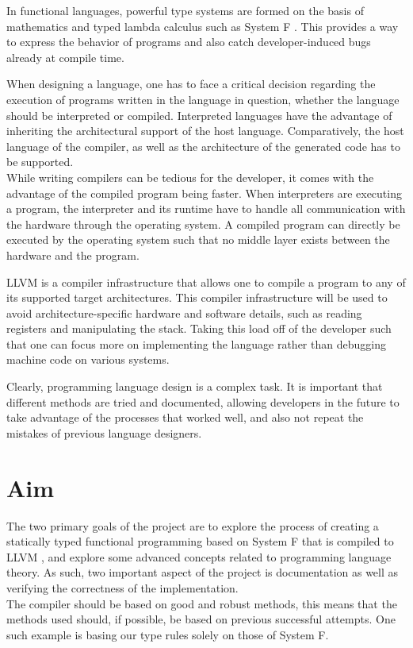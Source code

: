 \documentclass[12pt,a4paper]{article}
\begin{document}
In functional languages, powerful type systems are formed on the basis of mathematics and typed lambda calculus such
as System F \cite{girard1986system}. This provides a way to express the behavior of programs and also catch 
developer-induced bugs already at compile time.

When designing a language, one has to face a critical decision regarding the execution
of programs written in the language in question, whether the language should be
interpreted or compiled. Interpreted languages have the advantage of inheriting the architectural support of the host language. Comparatively, the host language of the compiler, as well as the architecture of the generated code has to be supported. \\
While writing compilers can be tedious for the developer, it comes with the
advantage of the compiled program being faster. When interpreters are executing
a program, the interpreter and its runtime have to handle all communication with the
hardware through the operating system. A compiled program can directly be executed by the 
operating system such that no middle layer exists between the hardware and the program.

LLVM \cite{llvm} is a compiler infrastructure that allows one to compile a program 
to any of its supported target architectures. This compiler infrastructure will be used to 
avoid architecture-specific hardware and software details, such as reading registers and
manipulating the stack. Taking this load off of the developer such that one can
focus more on implementing the language rather than debugging machine code on various
systems.

%
Clearly, programming language design is a complex task. It is important that different methods are tried and documented, allowing developers in the future to take advantage of the processes that worked well, and also not repeat the mistakes of previous language designers.

\newpage

\section{Aim}

The two primary goals of the project are to explore the process of creating a statically typed functional programming based on System F that is compiled to LLVM \cite{llvm}, and explore some advanced concepts related to programming language theory. As such, two important aspect of the project is documentation as well as verifying the correctness of the implementation. \\
The compiler should be based on good and robust methods, this means that the methods used should, if possible, be based on previous successful attempts. One such example is basing our type rules solely on those of System F.
\end{document}
